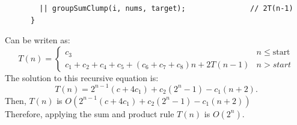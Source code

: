 \documentclass[a4paper,12pt]{article}
\begin{document}
\begin{enumerate}
\begin{Verbatim}
        || groupSumClump(i, nums, target);               // 2T(n-1)
      }
      \end{Verbatim}
      Can be writen as:
      \begin{equation*}
        T\left(n\right)=\left\{\begin{array}{cc}c_{3}&n\leq \text{start}\\c_{1}+c_{2}+c_{4}+c_{5}+\left(c_{6}+c_{7}+c_{8}\right)n+2T\left(n-1\right) & n>start\end{array}\right.
      \end{equation*}
      The solution to this recursive equation is:
      \begin{equation*}
        T\left( n \right) = 2^{n-1} \left( c + 4 c_1 \right) + c_2 \left( 2^{n} - 1 \right) - c_1 \left( n +2 \right).
      \end{equation*}
      Then, $T\left(n\right)$ is $O\left(2^{n-1} \left( c + 4 c_1 \right) + c_2 \left( 2^{n} - 1 \right) - c_1 \left( n +2 \right)\right)$\\
      Therefore, applying the sum and product rule $T(n)$ is $O(2^n)$.


\end{enumerate}
\end{document}
